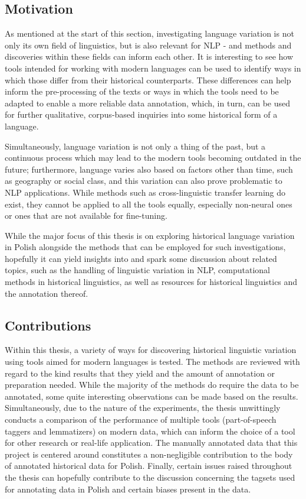 \subsection{Motivation}
\label{subsec:motivation}

As mentioned at the start of this section, investigating language variation is not only its own field of linguistics, but is also relevant for NLP - and methods and discoveries within these fields can inform each other. It is interesting to see how tools intended for working with modern languages can be used to identify ways in which those differ from their historical counterparts. These differences can help inform the pre-processing of the texts or ways in which the tools need to be adapted to enable a more reliable data annotation, which, in turn, can be used for further qualitative, corpus-based inquiries into some historical form of a language. 

Simultaneously, language variation is not only a thing of the past, but a continuous process which may lead to the modern tools becoming outdated in the future; furthermore, language varies also based on factors other than time, such as geography or social class, and this variation can also prove problematic to NLP applications. While methods such as cross-linguistic transfer learning do exist, they cannot be applied to all the tools equally, especially non-neural ones or ones that are not available for fine-tuning.

While the major focus of this thesis is on exploring historical language variation in Polish alongside the methods that can be employed for such investigations, hopefully it can yield insights into and spark some discussion about related topics, such as the handling of linguistic variation in NLP, computational methods in historical linguistics, as well as resources for historical linguistics and the annotation thereof.

\subsection{Contributions}
\label{subsec:contributions}

Within this thesis, a variety of ways for discovering historical linguistic variation using tools aimed for modern languages is tested. The methods are reviewed with regard to the kind results that they yield and the amount of annotation or preparation needed. While the majority of the methods do require the data to be annotated, some quite interesting observations can be made based on the results. Simultaneously, due to the nature of the experiments, the thesis unwittingly conducts a comparison of the performance of multiple tools (part-of-speech taggers and lemmatizers) on modern data, which can inform the choice of a tool for other research or real-life application. The manually annotated data that this project is centered around constitutes a non-negligible contribution to the body of annotated historical data for Polish. Finally, certain issues raised throughout the thesis can hopefully contribute to the discussion concerning the tagsets used for annotating data in Polish and certain biases present in the data.


